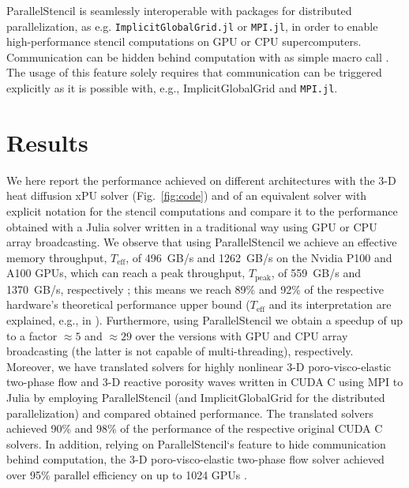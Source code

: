 \documentclass{juliacon}
\begin{document}
ParallelStencil is seamlessly interoperable with packages for distributed parallelization, as e.g. \texttt{ImplicitGlobalGrid.jl} \cite{implicitglobalgrid2022} or \texttt{MPI.jl}, in order to enable high-performance stencil computations on GPU or CPU supercomputers. Communication can be hidden behind computation with as simple macro call \cite{implicitglobalgrid2022}. The usage of this feature solely requires that communication can be triggered explicitly as it is possible with, e.g., ImplicitGlobalGrid and \texttt{MPI.jl}.

\section{Results}
We here report the performance achieved on different architectures with the 3-D heat diffusion xPU solver (Fig.~\ref{fig:code}) and of an equivalent solver with explicit notation for the stencil computations and compare it to the performance obtained with a Julia solver written in a traditional way using GPU or CPU array broadcasting. We observe that using ParallelStencil we achieve an effective memory throughput, $T_\mathrm{eff}$, of 496~GB/s and 1262~GB/s on the Nvidia P100 and A100 GPUs, which can reach a peak throughput, $T_\mathrm{peak}$, of 559~GB/s and 1370~GB/s, respectively \cite{deakin2020}; this means we reach 89\% and 92\% of the respective hardware's theoretical performance upper bound ($T_\mathrm{eff}$ and its interpretation are explained, e.g., in \cite{rass2022assessing}). Furthermore, using ParallelStencil we obtain a speedup of up to a factor $\approx 5$ and $\approx 29$ over the versions with GPU and CPU array broadcasting (the latter is not capable of multi-threading), respectively.
Moreover, we have translated solvers for highly nonlinear 3-D poro-visco-elastic two-phase flow and 3-D reactive porosity waves written in CUDA C using MPI to Julia by employing ParallelStencil (and ImplicitGlobalGrid for the distributed parallelization) and compared obtained performance. The translated solvers achieved 90\% and 98\% of the performance of the respective original CUDA C solvers. In addition, relying on ParallelStencil`s feature to hide communication behind computation, the 3-D poro-visco-elastic two-phase flow solver achieved over 95\% parallel efficiency on up to 1024 GPUs \cite{implicitglobalgrid2022}.
\end{document}
